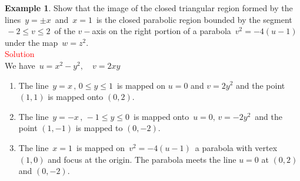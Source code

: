 \documentclass[11pt,a4paper]{article}
\theoremstyle{definition}
\newtheorem{example}[thm]{Example}
\begin{document}
\begin{example}
Show that the image of the closed triangular region formed by the lines $\, y = \pm x\,$ and $\, x = 1\,$ is the closed parabolic region bounded by the segment $\, -2\leq v \leq 2\,$ of the $v-$axis on the right portion of a parabola $\, v^2 = -4(u - 1)\,$ under the map $\, w = z^2$.\\


\textcolor{red}{Solution}\\
We have $\, u = x^2 -y^2,\quad  v = 2xy$

\begin{enumerate}
\item The line $\, y = x\, , \, 0 \leq y \leq 1\,$ is mapped on $ u = 0$ and $v = 2y^2$ and the point $(1,1)$ is mapped onto $(0,2)$.
\item The line $\, y = -x\, , \, -1\leq y \leq 0\,$ is mapped onto $\, u = 0, \, v = -2y^2\,$ and the point $(1,-1)$ is mapped to $(0,-2)$.
\item The line $\, x = 1\,$ is mapped on $\, v^2 = -4(u - 1)\,$ a parabola with vertex  $(1,0)$ and focus at the origin. The parabola meets the line $u = 0$ at $(0,2)$ and $(0,-2)$.






\begin{figure}[H]
\centering
{}
\end{figure}




\end{enumerate}
\end{example}
\end{document}
